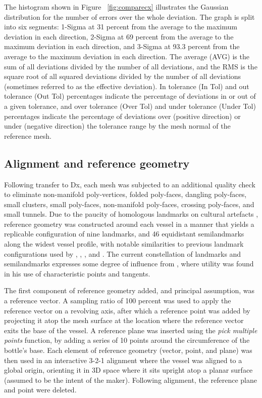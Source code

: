 \documentclass[review]{elsarticle}
\begin{document}
The histogram shown in Figure ~\ref{fig:comparecx} illustrates the Gaussian distribution for the number of errors over the whole deviation. The graph is split into six segments: 1-Sigma at 31 percent from the average to the maximum deviation in each direction, 2-Sigma at 69 percent from the average to the maximum deviation in each direction, and 3-Sigma at 93.3 percent from the average to the maximum deviation in each direction. The average (AVG) is the sum of all deviations divided by the number of all deviations, and the RMS is the square root of all squared deviations divided by the number of all deviations (sometimes referred to as the effective deviation). In tolerance (In Tol) and out tolerance (Out Tol) percentages indicate the percentage of deviations in or out of a given tolerance, and over tolerance (Over Tol) and under tolerance (Under Tol) percentages indicate the percentage of deviations over (positive direction) or under (negative direction) the tolerance range by the mesh normal of the reference mesh.

\subsection{Alignment and reference geometry}

Following transfer to Dx, each mesh was subjected to an additional quality check to eliminate non-manifold poly-vertices, folded poly-faces, dangling poly-faces, small clusters, small poly-faces, non-manifold poly-faces, crossing poly-faces, and small tunnels. Due to the paucity of homologous landmarks on cultural artefacts \citep{RN1730}, reference geometry was constructed around each vessel in a manner that yields a replicable configuration of nine landmarks, and 46 equidistant semilandmarks along the widest vessel profile, with notable similarities to previous landmark configurations used by \citet[Figure 4]{RN1752}, \citet[Figure 2]{RN11716}, \citet[Figure 5]{RN1994}, and \citet[Figure 4]{RN11631}. The current constellation of landmarks and semilandmarks expresses some degree of influence from \citet{RN11786}, where utility was found in his use of characteristic points and tangents.

The first component of reference geometry added, and principal assumption, was a reference vector. A sampling ratio of 100 percent was used to apply the reference vector on a revolving axis, after which a reference point was added by projecting it atop the mesh surface at the location where the reference vector exits the base of the vessel. A reference plane was inserted using the \textit{pick multiple points} function, by adding a series of 10 points around the circumference of the bottle's base. Each element of reference geometry (vector, point, and plane) was then used in an interactive 3-2-1 alignment where the vessel was aligned to a global origin, orienting it in 3D space where it sits upright atop a planar surface (assumed to be the intent of the maker). Following alignment, the reference plane and point were deleted.
\end{document}
